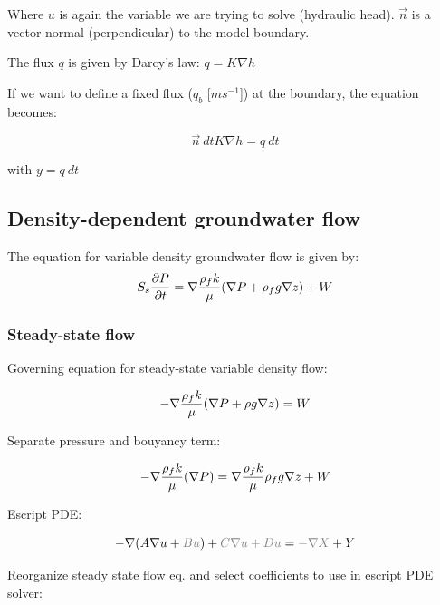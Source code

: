 \documentclass[11pt]{article}
\begin{document}
Where $u$ is again the variable we are trying to solve (hydraulic head). $\vec n$ is a vector normal (perpendicular) to the model boundary. 


The flux $q$ is given by Darcy's law: $q = K \nabla h$

If we want to define a fixed flux ($q_b$ [$m s^{-1}$]) at the boundary, the equation becomes:

\begin{equation}
	\vec n \: dt K \nabla h = q \: dt
\end{equation}

with 
$y = q \: dt $


\subsection{Density-dependent groundwater flow}

The equation for variable density groundwater flow is given by:
\begin{equation}
    \label{eq:var_density_flow}
	 S_s { \partial P \over {\partial t} } = \nabla { \rho_f k \over{\mu} } (\nabla P + \rho_f g \nabla z ) + W
\end{equation}



\subsubsection{Steady-state flow}

Governing equation for steady-state variable density flow:

\begin{equation}
	   - \nabla {\rho _{f} k \over{\mu} } (\nabla P + \rho g \nabla z) = W
\end{equation}

Separate pressure and bouyancy term:

\begin{equation}
	   - \nabla {\rho _{f} k \over{\mu} } (\nabla P )  = \nabla {\rho_{f} k \over{\mu} } \rho_f g \nabla z + W
\end{equation}

Escript PDE:

\begin{equation}
    - \nabla (A \nabla u + {\color{gray}B u} ) + {\color{gray}C \nabla u + D u } = {\color{gray}- \nabla X} + Y
\end{equation}

Reorganize steady state flow eq. and select coefficients to use in escript PDE solver:
\end{document}
